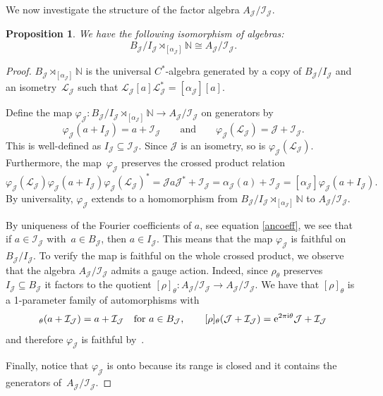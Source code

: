 \documentclass[pdftex]{sigma}
\newcommand{\N}{{\mathbb N}}
\newcommand{\fancyI}{\mathcal{I}}
\newcommand{\fancyJ}{\mathcal{J}}
\newcommand{\fancyL}{\mathcal{L}}
\numberwithin{equation}{section}
\newtheorem{Proposition}[Theorem]{Proposition}
 { \theoremstyle{definition}
\newtheorem{Definition}[Theorem]{Definition}
\newtheorem{Note}[Theorem]{Note}
\newtheorem{Example}[Theorem]{Example}
\newtheorem{Remark}[Theorem]{Remark} }
\begin{document}
We now investigate the structure of the factor algebra $A_\fancyJ/\fancyI_\fancyJ$.
\begin{Proposition}\label{FactorCross}
We have the following isomorphism of algebras:
\begin{equation*}
B_\fancyJ/I_\fancyJ \rtimes_{[\alpha_\fancyJ]} \N \cong A_\fancyJ/\fancyI_\fancyJ.
\end{equation*}
\end{Proposition}
\begin{proof}
$B_\fancyJ \rtimes_{[\alpha_\fancyJ]} \N$ is the universal $C^*$-algebra generated by a copy of $B_\fancyJ/I_\fancyJ$ and an isometry~$\fancyL_\fancyJ$ such that
$
\fancyL_\fancyJ[a]\fancyL_\fancyJ^* = [\alpha_\fancyJ][a]$.


Define the map $\varphi_\fancyJ\colon B_\fancyJ/I_\fancyJ\rtimes_{[\alpha_\fancyJ]}\N \to A_\fancyJ/\fancyI_\fancyJ$ on generators by
\begin{equation*}
\varphi_\fancyJ(a+I_\fancyJ) = a+\fancyI_\fancyJ\qquad\text{and}\qquad \varphi_\fancyJ(\fancyL_\fancyJ) = \fancyJ+\fancyI_\fancyJ.
\end{equation*}
This is well-defined as $I_\fancyJ \subseteq \fancyI_\fancyJ$. Since $\fancyJ$ is an isometry, so is $\varphi_\fancyJ(\fancyL_\fancyJ)$. Furthermore, the map~$\varphi_\fancyJ$ preserves the crossed product relation
\begin{equation*}
\varphi_\fancyJ(\fancyL_\fancyJ)\varphi_\fancyJ(a+I_\fancyJ)\varphi_\fancyJ(\fancyL_\fancyJ)^* = \fancyJ a \fancyJ^* + \fancyI_\fancyJ = \alpha_\fancyJ(a)+\fancyI_\fancyJ = [\alpha_\fancyJ]\varphi_\fancyJ(a+I_\fancyJ).
\end{equation*}
By universality, $\varphi_\fancyJ$ extends to a homomorphism from $B_\fancyJ/I_\fancyJ\rtimes_{[\alpha_\fancyJ]}\N$ to $A_\fancyJ/\fancyI_\fancyJ$.

By uniqueness of the Fourier coefficients of $a$, see equation \eqref{ancoeff}, we see that if $a\in \fancyI_\fancyJ$ with~${a\in B_\fancyJ}$, then $a\in I_\fancyJ$. This means that the map $\varphi_\fancyJ$ is faithful on $B_\fancyJ/I_\fancyJ$. To verify the map is faithful on the whole crossed product, we observe that the algebra $A_\fancyJ/\fancyI_\fancyJ$ admits a gauge action.
Indeed, since $\rho_\theta$ preserves $I_\fancyJ \subseteq B_\fancyJ$ it factors to the quotient $[\rho]_\theta \colon A_\fancyJ/\fancyI_\fancyJ \to A_\fancyJ/\fancyI_\fancyJ$.
We have that $[\rho]_\theta $ is a 1-parameter family of automorphisms with
\begin{equation*}
[\rho]_\theta (a+\fancyI_\fancyJ) = a+\fancyI_\fancyJ \quad \text{for } a\in B_\fancyJ ,\qquad
[\rho]_\theta (\fancyJ+\fancyI_\fancyJ) = {\rm e}^{2\pi {\rm i} \theta}\fancyJ + \fancyI_\fancyJ
\end{equation*}
and therefore $\varphi_\fancyJ$ is faithful by~\cite{BKR}.

Finally, notice that $\varphi_\fancyJ$ is onto because its range is closed and it contains the generators of~$A_\fancyJ/\fancyI_\fancyJ$.
\end{proof}
\end{document}
